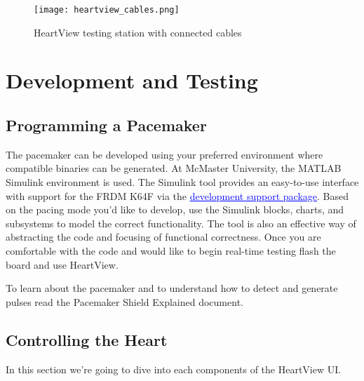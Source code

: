 \documentclass[11pt,fleqn]{book} %
\begin{document}
\begin{figure}[h]
	\centering\texttt{[image: heartview\_cables.png]}
	\caption{HeartView testing station with connected cables}
	\label{fig:heartview_cables} %
\end{figure}




\section{Development and Testing}

\subsection{Programming a Pacemaker}

The pacemaker can be developed using your preferred environment where compatible binaries can be generated. At McMaster University, the MATLAB Simulink environment is used. The Simulink tool provides an easy-to-use interface with support for the FRDM K64F via the \href{https://www.mathworks.com/matlabcentral/fileexchange/55318-simulink-coder-support-package-for-nxp-frdm-k64f-board}{\textcolor{blue}{\underline{development support package}}}. Based on the pacing mode you'd like to develop, use the Simulink blocks, charts, and subsystems to model the correct functionality. The tool is also an effective way of abstracting the code and focusing of functional correctness. Once you are comfortable with the code and would like to begin real-time testing flash the board and use HeartView.

To learn about the pacemaker and to understand how to detect and generate pulses read the Pacemaker Shield Explained document. 


\subsection{Controlling the Heart}

In this section we're going to dive into each components of the HeartView UI. 
\end{document}
